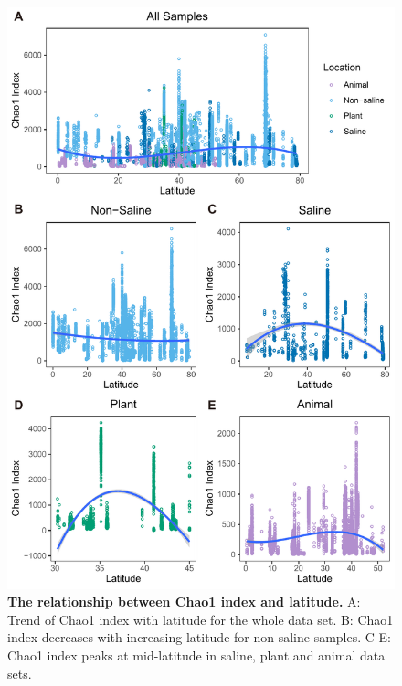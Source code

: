 \begin{figure}[H]
    \centering
    \includegraphics[scale=0.9]{./Figures/Chao_lati_empo2}
    \caption{\textbf{The relationship between Chao1 index and latitude.} A: Trend of Chao1 index with latitude for the whole data set. B: Chao1 index decreases with increasing latitude for non-saline samples. C-E: Chao1 index peaks at mid-latitude in saline, plant and animal data sets.}
    \label{fig:Chao_lati}
\end{figure}

